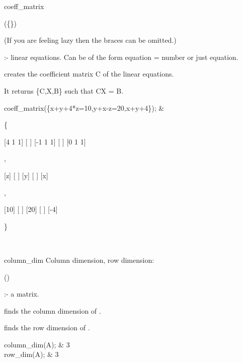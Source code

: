 \begin{Operator}{coeff_matrix}

\begin{Syntax}
(\{\}) 
\end{Syntax}

(If you are feeling lazy then the braces can be omitted.)

  :- linear equations. Can be of the form equation = number
or just equation.

 creates the coefficient matrix C of the linear 
equations. 

It returns \{C,X,B\} such that CX = B.

\begin{Examples}

coeff_matrix(\{x+y+4*z=10,y+x-z=20,x+y+4\}); &
\begin{multilineoutput}{6cm}
\{

 [4   1  1]
 [        ]
 [-1  1  1]
 [        ]
 [0   1  1]

 ,

 [z]
 [ ]
 [y]
 [ ]
 [x]

 ,

 [10]
 [  ]
 [20]
 [  ]
 [-4]

\}
\end{multilineoutput} \\

\end{Examples}

\end{Operator}


\begin{Operator}{column_dim}
Column dimension, row dimension:

\begin{Syntax}
()
\end{Syntax}

 :- a matrix.

 finds the column dimension of . 

 finds the row dimension of .


\begin{Examples}

column_dim(A); &
3 \\
row_dim(A); &
3 \\

\end{Examples}

\end{Operator}


